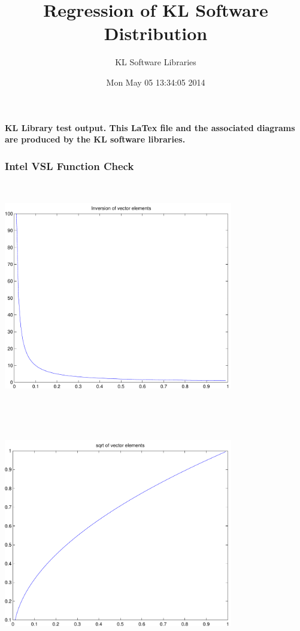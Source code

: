 \documentclass[9pt]{article}
\theoremstyle{plain}
\theoremstyle{definition}
\theoremstyle{remark}
\numberwithin{equation}{section}
\begin{document}
\title{Regression of KL Software Distribution   }
\author{KL Software Libraries}
\date{Mon May 05 13:34:05 2014
}
\maketitle
\textbf{ KL Library test output.  This LaTex file and the associated diagrams are produced by the KL software libraries.}
\subsubsection{Intel VSL Function Check}
\includegraphics[width=10.0cm,height=10.0cm]{klVSLInv.pdf}

\includegraphics[width=10.0cm,height=10.0cm]{klVSLSqrt.pdf}
\end{document}
